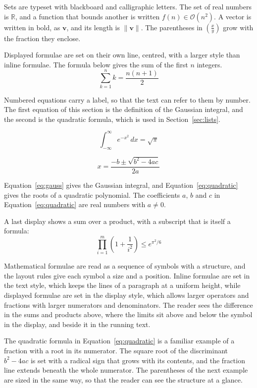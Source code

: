 \documentclass{article}
\begin{document}
Sets are typeset with blackboard and calligraphic letters. The set of real numbers is
$\mathbb{R}$, and a function that bounds another is written $f(n) \in \mathcal{O}(n^2)$.
A vector is written in bold, as $\mathbf{v}$, and its length is $\|\mathbf{v}\|$. The
parentheses in $\left( \frac{x}{y} \right)$ grow with the fraction they enclose.

Displayed formulae are set on their own line, centred, with a larger style than inline
formulae. The formula below gives the sum of the first $n$ integers.
\[
  \sum_{k=1}^{n} k = \frac{n(n+1)}{2}
\]

Numbered equations carry a label, so that the text can refer to them by number. The
first equation of this section is the definition of the Gaussian integral, and the
second is the quadratic formula, which is used in Section~\ref{sec:lists}.

\begin{equation}\label{eq:gauss}
  \int_{-\infty}^{\infty} e^{-x^{2}}\,dx = \sqrt{\pi}
\end{equation}

\begin{equation}\label{eq:quadratic}
  x = \frac{-b \pm \sqrt{b^{2}-4ac}}{2a}
\end{equation}

Equation~\ref{eq:gauss} gives the Gaussian integral, and
Equation~\ref{eq:quadratic} gives the roots of a quadratic polynomial. The coefficients
$a$, $b$ and $c$ in Equation~\ref{eq:quadratic} are real numbers with $a \neq 0$.

A last display shows a sum over a product, with a subscript that is itself a formula:
\[
  \prod_{i=1}^{m} \left( 1 + \frac{1}{i^{2}} \right) \leq e^{\pi^{2}/6}
\]

Mathematical formulae are read as a sequence of symbols with a structure, and the layout
rules give each symbol a size and a position. Inline formulae are set in the text style,
which keeps the lines of a paragraph at a uniform height, while displayed formulae are
set in the display style, which allows larger operators and fractions with larger
numerators and denominators. The reader sees the difference in the sums and products
above, where the limits sit above and below the symbol in the display, and beside it in
the running text.

The quadratic formula in Equation~\ref{eq:quadratic} is a familiar example of a
fraction with a root in its numerator. The square root of the discriminant
$b^{2}-4ac$ is set with a radical sign that grows with its contents, and the
fraction line extends beneath the whole numerator. The parentheses of the next example
are sized in the same way, so that the reader can see the structure at a glance.
\end{document}
